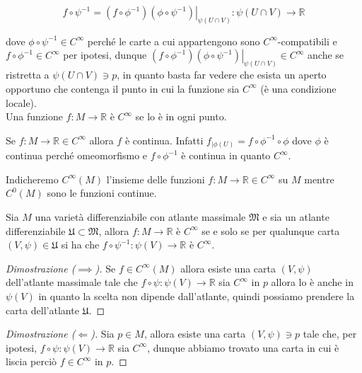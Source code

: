 \begin{equation}
	f \circ \psi^{-1} = \left. (f \circ \phi^{-1})(\phi \circ \psi^{-1}) \right|_{\psi(U \cap V)} : \psi(U \cap V) \to \mathbb{R}
\end{equation}

dove $ \phi \circ \psi^{-1} \in C^{\infty} $ perché le carte a cui appartengono sono $ C^{\infty} $-compatibili e $ f \circ \phi^{-1} \in C^{\infty} $ per ipotesi, dunque $ \left. (f \circ \phi^{-1})(\phi \circ \psi^{-1}) \right|_{\psi(U \cap V)} \in C^{\infty} $ anche se ristretta a $ \psi(U \cap V) \ni p $, in quanto basta far vedere che esista un aperto opportuno che contenga il punto in cui la funzione sia $ C^{\infty} $ (è una condizione locale).\\
Una funzione $ f : M \to \mathbb{R} $ è $ C^{\infty} $ se lo è in ogni punto.

\begin{remark}
	Se $ f : M \to \mathbb{R} \in C^{\infty} $ allora $ f $ è continua. Infatti $ f_{|\phi(U)} = f \circ \phi^{-1} \circ \phi $ dove $ \phi $ è continua perché omeomorfismo e $ f \circ \phi^{-1} $ è continua in quanto $ C^{\infty} $.
\end{remark}

Indicheremo $ C^{\infty}(M) $ l'insieme delle funzioni $ f : M \to \mathbb{R} \in C^{\infty} $ su $ M $ mentre $ C^{0}(M) $ sono le funzioni continue.

\begin{definition}
	Sia $ M $ una varietà differenziabile con atlante massimale $ \mathfrak{M} $ e sia un atlante differenziabile $ \mathfrak{U} \subset \mathfrak{M} $, allora $ f : M \to \mathbb{R} $ è $ C^{\infty} $ se e solo se per qualunque carta $ (V,\psi) \in \mathfrak{U} $ si ha che $ f \circ \psi^{-1} : \psi(V) \to \mathbb{R} $ è $ C^{\infty} $.
\end{definition}

\begin{proof}[Dimostrazione ($ \implies $)]
	Se $ f \in C^{\infty}(M) $ allora esiste una carta $ (V,\psi) $ dell'atlante massimale tale che $ f \circ \psi : \psi(V) \to \mathbb{R} $ sia $ C^{\infty} $ in $ p $ allora lo è anche in $ \psi(V) $ in quanto la scelta non dipende dall'atlante, quindi possiamo prendere la carta dell'atlante $ \mathfrak{U} $.
\end{proof}

\begin{proof}[Dimostrazione ($ \Longleftarrow $)]
	Sia $ p \in M $, allora esiste una carta $ (V,\psi) \ni p $ tale che, per ipotesi, $ f \circ \psi : \psi(V) \to \mathbb{R} $ sia $ C^{\infty} $, dunque abbiamo trovato una carta in cui è liscia perciò $ f \in C^{\infty} $ in $ p $.
\end{proof}

